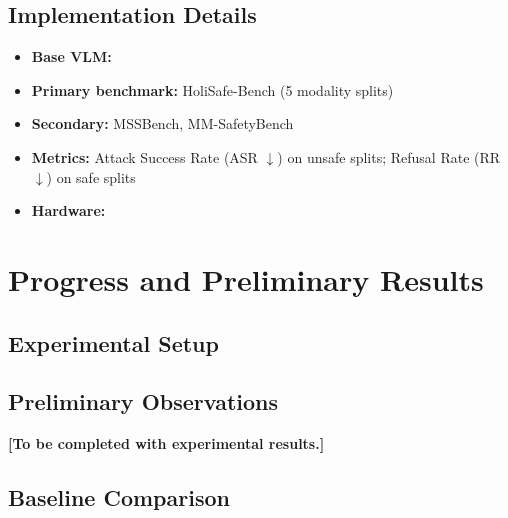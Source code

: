 \documentclass{article}
\begin{document}
\subsection{Implementation Details}
\begin{itemize}[leftmargin=*]
  \item \textbf{Base VLM:} %
  \item \textbf{Primary benchmark:} HoliSafe-Bench (5 modality splits)
  \item \textbf{Secondary:} MSSBench, MM-SafetyBench
  \item \textbf{Metrics:} Attack Success Rate (ASR $\downarrow$) on unsafe splits;
        Refusal Rate (RR $\downarrow$) on safe splits
  \item \textbf{Hardware:} %
\end{itemize}

\section{Progress and Preliminary Results}

\subsection{Experimental Setup}

\subsection{Preliminary Observations}
\textbf{[To be completed with experimental results.]}

\subsection{Baseline Comparison}
\end{document}
